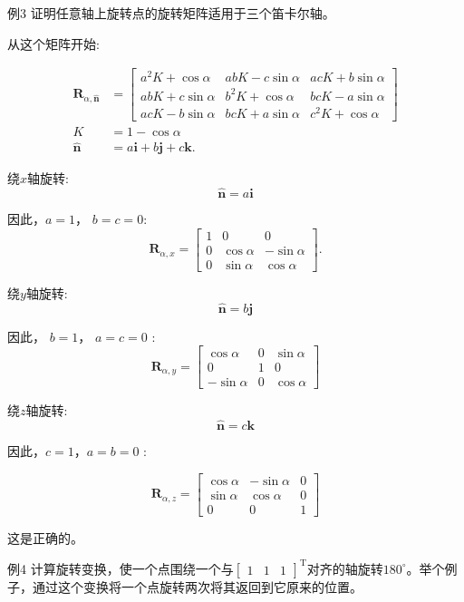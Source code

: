 例3 证明任意轴上旋转点的旋转矩阵适用于三个笛卡尔轴。

从这个矩阵开始:

$$
\begin{aligned}
\mathbf{R}_{\alpha, \hat{\mathbf{n}}} & =\left[\begin{array}{ccc}
a^{2} K+\cos \alpha & a b K-c \sin \alpha & a c K+b \sin \alpha \\
a b K+c \sin \alpha & b^{2} K+\cos \alpha & b c K-a \sin \alpha \\
a c K-b \sin \alpha & b c K+a \sin \alpha & c^{2} K+\cos \alpha
\end{array}\right] \\
K & =1-\cos \alpha \\
\hat{\mathbf{n}} & =a \mathbf{i}+b \mathbf{j}+c \mathbf{k} .
\end{aligned}
$$

绕$x$轴旋转:
$$
\hat{\mathbf{n}}=a \mathbf{i}
$$

因此，$a=1$， $b=c=0$:
$$
\mathbf{R}_{\alpha, x}=\left[\begin{array}{ccc}
1 & 0 & 0 \\
0 & \cos \alpha & -\sin \alpha \\
0 & \sin \alpha & \cos \alpha
\end{array}\right] .
$$

绕$y$轴旋转:
$$
\hat{\mathbf{n}}=b \mathbf{j}
$$

因此， $b=1$， $a=c=0$ :
$$
\mathbf{R}_{\alpha, y}=\left[\begin{array}{ccc}
\cos \alpha & 0 & \sin \alpha \\
0 & 1 & 0 \\
-\sin \alpha & 0 & \cos \alpha
\end{array}\right]
$$

绕$z$轴旋转:
$$
\hat{\mathbf{n}}=c \mathbf{k}
$$

因此，$c=1$，$a=b=0$ :

$$
\mathbf{R}_{\alpha, z}=\left[\begin{array}{ccc}
\cos \alpha & -\sin \alpha & 0 \\
\sin \alpha & \cos \alpha & 0 \\
0 & 0 & 1
\end{array}\right]
$$

这是正确的。

例4 计算旋转变换，使一个点围绕一个与$\left[\begin{array}{lll}1 & 1 & 1\end{array}\right]^{\mathrm {T}}$对齐的轴旋转$180^{\circ}$。举个例子，通过这个变换将一个点旋转两次将其返回到它原来的位置。

